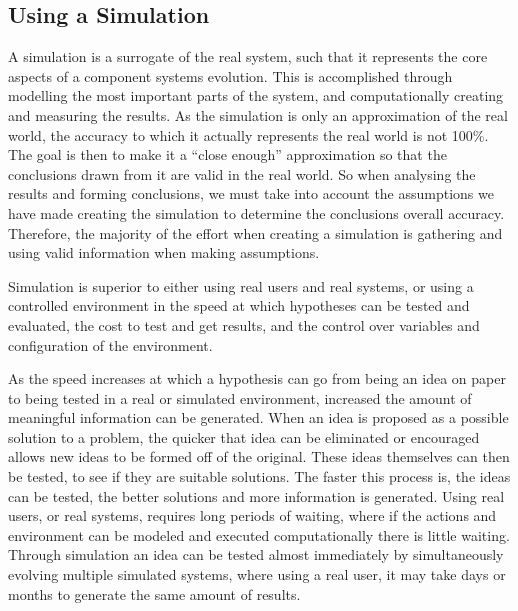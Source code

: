 \subsection{Using a Simulation}
A simulation is a surrogate of the real system, such that it represents the core aspects of a component systems evolution.
This is accomplished through modelling the most important parts of the system, 
and computationally creating and measuring the results. 
As the simulation is only an approximation of the real world, 
the accuracy to which it actually represents the real world is not 100\%.
The goal is then to make it a ``close enough'' approximation so that the conclusions drawn from it are valid in the real world.
So when analysing the results and forming conclusions, we must take into account the assumptions we have made creating the simulation to determine 
the conclusions overall accuracy.
Therefore, the majority of the effort when creating a simulation is gathering and using valid information when making assumptions.

Simulation is superior to either using real users and real systems, or using a controlled environment in the speed at which hypotheses can be tested and evaluated,
the cost to test and get results, and the control over variables and configuration of the environment.

As the speed increases at which a hypothesis can go from being an idea on paper to being tested in a real or simulated environment, increased the amount of meaningful information can be generated. 
When an idea is proposed as a possible solution to a problem, the quicker that idea can be eliminated or encouraged allows new ideas to be formed off of the original.
These ideas themselves can then be tested, to see if they are suitable solutions.
The faster this process is, the ideas can be tested, the better solutions and more information is generated.
Using real users, or real systems, requires long periods of waiting, where if the actions and environment can be modeled and executed computationally there is little waiting.
Through simulation an idea can be tested almost immediately by simultaneously evolving multiple simulated systems, where using a real user, 
it may take days or months to generate the same amount of results.  

